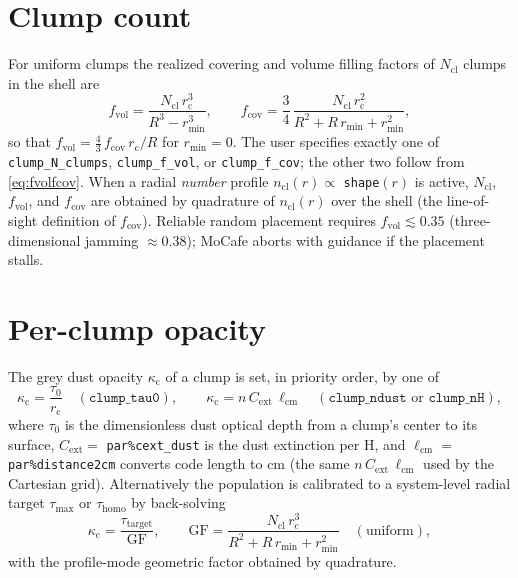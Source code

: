\documentclass[english,a4paper]{kiseon_memo}
\newcommand{\kc}{\kappa_{\mathrm c}}
\newcommand{\rc}{r_{\mathrm c}}
\newcommand{\fcov}{f_{\mathrm{cov}}}
\newcommand{\fvol}{f_{\mathrm{vol}}}
\newcommand{\Ncl}{N_{\mathrm{cl}}}
\begin{document}
\section{Clump count}
For uniform clumps the realized covering and volume filling factors of $\Ncl$
clumps in the shell are
\begin{equation}
  \fvol = \frac{\Ncl\,\rc^{3}}{R^{3}-r_{\min}^{3}},
  \qquad
  \fcov = \frac{3}{4}\,
          \frac{\Ncl\,\rc^{2}}{R^{2}+R\,r_{\min}+r_{\min}^{2}} ,
  \label{eq:fvolfcov}
\end{equation}
so that $\fvol = \tfrac{4}{3}\,\fcov\,\rc/R$ for $r_{\min}=0$.  The user
specifies exactly one of \texttt{clump\_N\_clumps}, \texttt{clump\_f\_vol}, or
\texttt{clump\_f\_cov}; the other two follow from \eqref{eq:fvolfcov}.  When a
radial \emph{number} profile $n_{\mathrm{cl}}(r)\propto$ \texttt{shape}$(r)$ is
active, $\Ncl$, $\fvol$, and $\fcov$ are obtained by quadrature of
$n_{\mathrm{cl}}(r)$ over the shell (the line-of-sight definition of $\fcov$).
Reliable random placement requires $\fvol\lesssim0.35$ (three-dimensional
jamming $\approx0.38$); MoCafe aborts with guidance if the placement stalls.

\section{Per-clump opacity}
The grey dust opacity $\kc$ of a clump is set, in priority order, by one of
\begin{equation}
  \kc = \frac{\tau_{0}}{\rc}
  \quad(\texttt{clump\_tau0}),
  \qquad
  \kc = n\,C_{\mathrm{ext}}\,\ell_{\mathrm{cm}}
  \quad(\texttt{clump\_ndust} \text{ or } \texttt{clump\_nH}),
  \label{eq:kappa}
\end{equation}
where $\tau_{0}$ is the dimensionless dust optical depth from a clump's center
to its surface, $C_{\mathrm{ext}}=$ \texttt{par\%cext\_dust} is the dust
extinction per H, and $\ell_{\mathrm{cm}}=$ \texttt{par\%distance2cm} converts
code length to cm (the same $n\,C_{\mathrm{ext}}\,\ell_{\mathrm{cm}}$ used by the
Cartesian grid).  Alternatively the population is calibrated to a system-level
radial target $\tau_{\max}$ or $\tau_{\mathrm{homo}}$ by back-solving
\begin{equation}
  \kc = \frac{\tau_{\mathrm{target}}}{\mathrm{GF}},\qquad
  \mathrm{GF} = \frac{\Ncl\,\rc^{3}}{R^{2}+R\,r_{\min}+r_{\min}^{2}}
  \quad(\text{uniform}),
\end{equation}
with the profile-mode geometric factor obtained by quadrature.
\end{document}

